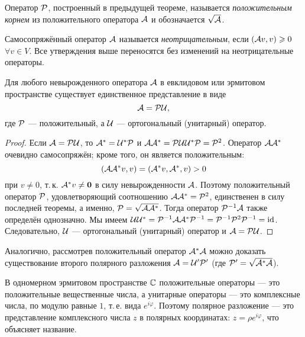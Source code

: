 \begin{definition}
    Оператор $\P$, построенный в предыдущей теореме, называется \textit{положительным корнем} из положительного оператора $\A$ и обозначается $\sqrt{\A}$.
\end{definition}

\begin{definition}
    Самосопряжённый оператор $\A$ называется \textit{неотрицательным}, если $(\A v, v) \geqslant 0$ $\forall v \in V$. Все утверждения выше переносятся без изменений на неотрицательные операторы.
\end{definition}

\begin{theorem}
    Для любого невырожденного оператора $\A$ в евклидовом или эрмитовом пространстве существует единственное представление в виде
    \[
        \A = \P\U,
    \]
    где $\P$ --- положительный, а $\U$ --- ортогональный (унитарный) оператор.
\end{theorem}

\begin{proof}
    Если $\A = \P\U$, то $\A^\ast = \U^\ast\P$ и $\A\A^\ast = \P\U\U^\ast\P = \P^2$. Оператор $\A\A^\ast$ очевидно самосопряжён; кроме того, он является положительным:
    \[
        (\A\A^\ast v, v) = (\A^\ast v, \A^\ast, v) > 0
    \]
    при $v \ne 0$, т.\,к. $\A^\ast v \ne \bs{0}$ в силу невырожденности $\A$. Поэтому положительный оператор $\P$, удовлетворяющий соотношению $\A\A^\ast = \P^2$, единственен в силу последней теоремы, а именно, $\P = \sqrt{\A\A^\ast}$. Тогда оператор $\P^{-1}\A$ также определён однозначно. Мы имеем $\U\U^\ast = \P^{-1}\A\A^\ast\P^{-1} = \P^{-1}\P^2\P^{-1} = \id$. Следовательно, $\U$ --- ортогональный (унитарный) оператор и $\A = \P\U$.
\end{proof}

Аналогично, рассмотрев положительный оператор $\A^\ast\A$ можно доказать существование второго полярного разложения $\A = \U^\prime\P^\prime$ (где $\P^\prime = \sqrt{\A^\ast\A}$).

В одномерном эрмитовом пространстве $\C$ положительные операторы --- это положительные вещественные числа, а унитарные операторы --- это комплексные числа, по модулю равные $1$, т.\,е. вида $e^{i\varphi}$. Поэтому полярное разложение --- это представление комплексного числа $z$ в полярных координатах: $z = \rho e^{i\varphi}$, что объясняет название.

